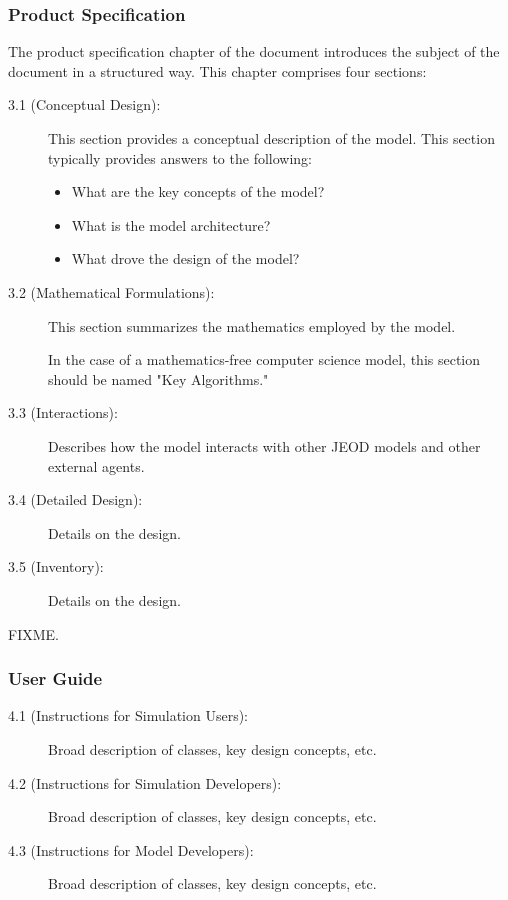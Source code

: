 \subsubsection{Product Specification}
\label{sec:chapterthree}
The product specification chapter of the document introduces the subject of the document
in a structured way. This chapter comprises four sections:
\begin{description}
\item[3.1 (Conceptual Design):] This section provides
a conceptual description of the model.
This section typically provides answers to the following:
\begin{itemize}
\item What are the key concepts of the model?
\item What is the model architecture?
\item What drove the design of the model?
\end{itemize}

\item[3.2 (Mathematical Formulations):] This section summarizes
the mathematics employed by the model.

In the case of a mathematics-free computer science model,
this section should be named "Key Algorithms."
\item[3.3 (Interactions):] Describes how the model interacts with
other JEOD models and other external agents.
\item[3.4 (Detailed Design):] Details on the design.
\item[3.5 (Inventory):] Details on the design.
\end{description}

FIXME.

\subsubsection{User Guide}
\label{sec:chapterfour}
\begin{description}
\item[4.1 (Instructions for Simulation Users):] Broad description of classes, key design concepts, etc.
\item[4.2 (Instructions for Simulation Developers):] Broad description of classes, key design concepts, etc.
\item[4.3 (Instructions for Model Developers):] Broad description of classes, key design concepts, etc.
\end{description}


